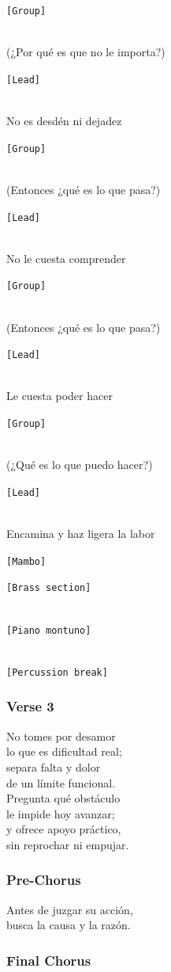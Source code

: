 \texttt{{[}Group{]}}\strut \\
(¿Por qué es que no le importa?)

\texttt{{[}Lead{]}}\strut \\
No es desdén ni dejadez

\texttt{{[}Group{]}}\strut \\
(Entonces ¿qué es lo que pasa?)

\texttt{{[}Lead{]}}\strut \\
No le cuesta comprender

\texttt{{[}Group{]}}\strut \\
(Entonces ¿qué es lo que pasa?)

\texttt{{[}Lead{]}}\strut \\
Le cuesta poder hacer

\texttt{{[}Group{]}}\strut \\
(¿Qué es lo que puedo hacer?)

\texttt{{[}Lead{]}}\strut \\
Encamina y haz ligera la labor

\texttt{{[}Mambo{]}}

\texttt{{[}Brass\ section{]}}\strut \\
\texttt{{[}Piano\ montuno{]}}\strut \\
\texttt{{[}Percussion\ break{]}}

\subsubsection{Verse 3}\label{verse-3-14}

No tomes por desamor\\
lo que es dificultad real;\\
separa falta y dolor\\
de un límite funcional.\\
Pregunta qué obstáculo\\
le impide hoy avanzar;\\
y ofrece apoyo práctico,\\
sin reprochar ni empujar.

\subsubsection{Pre-Chorus}\label{pre-chorus-35}

Antes de juzgar su acción,\\
busca la causa y la razón.

\subsubsection{Final Chorus}\label{final-chorus-2}

